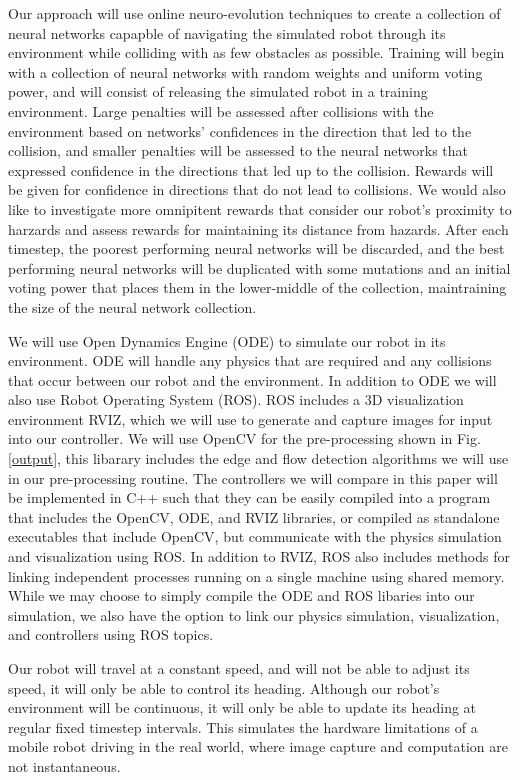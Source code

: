 \documentclass[letterpaper, 10 pt, conference]{ieeeconf}
\begin{document}
		Our approach will use online neuro-evolution techniques to create a collection of neural networks capapble of navigating the simulated robot through its environment while colliding with as few obstacles as possible.  Training will begin with a collection of neural networks with random weights and uniform voting power, and will consist of releasing the simulated robot in a training environment.  Large penalties will be assessed after collisions with the environment based on networks' confidences in the direction that led to the collision, and smaller penalties will be assessed to the neural networks that expressed confidence in the directions that led up to the collision.  Rewards will be given for confidence in directions that do not lead to collisions.  We would also like to investigate more omnipitent rewards that consider our robot's proximity to harzards and assess rewards for maintaining its distance from hazards.  After each timestep, the poorest performing neural networks will be discarded, and the best performing neural networks will be duplicated with some mutations and an initial voting power that places them in the lower-middle of the collection, maintraining the size of the neural network collection. 

		We will use Open Dynamics Engine (ODE) to simulate our robot in its environment.  ODE will handle any physics that are required and any collisions that occur between our robot and the environment.  In addition to ODE we will also use Robot Operating System (ROS).  ROS includes a 3D visualization environment RVIZ, which we will use to generate and capture images for input into our controller.  We will use OpenCV for the pre-processing shown in Fig. \ref{output}, this libarary includes the edge and flow detection algorithms we will use in our pre-processing routine. The controllers we will compare in this paper will be implemented in C++ such that they can be easily compiled into a program that includes the OpenCV, ODE, and RVIZ libraries, or compiled as standalone executables that include OpenCV, but communicate with the physics simulation and visualization using ROS.  In addition to RVIZ, ROS also includes methods for linking independent processes running on a single machine using shared memory.  While we may choose to simply compile the ODE and ROS libaries into our simulation, we also have the option to link our physics simulation, visualization, and controllers using ROS topics. 

		Our robot will travel at a constant speed, and will not be able to adjust its speed, it will only be able to control its heading.  Although our robot's environment will be continuous, it will only be able to update its heading at regular fixed timestep intervals.  This simulates the hardware limitations of a mobile robot driving in the real world, where image capture and computation are not instantaneous.
\end{document}
